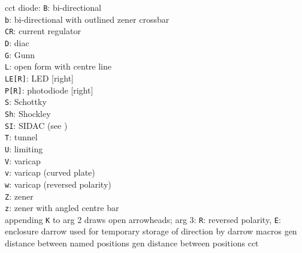 %
  {cct}%
  {diode:
   {\tt B}: bi-directional\\
   {\tt b}: bi-directional with outlined zener crossbar\\
   {\tt CR}: current regulator\\
   {\tt D}: diac\\
   {\tt G}: Gunn\\
   {\tt L}: open form with centre line\\
   {\tt LE[R]}: LED [right]\\
   {\tt P[R]}: photodiode [right]\\
   {\tt S}: Schottky\\
   {\tt Sh}: Shockley\\
   {\tt SI}: SIDAC (see )\\
   {\tt T}: tunnel\\
   {\tt U}: limiting\\
   {\tt V}: varicap\\
   {\tt v}: varicap (curved plate)\\
   {\tt w}: varicap (reversed polarity)\\
   {\tt Z}: zener\\
   {\tt z}: zener with angled centre bar\\
   appending {\tt K} to arg 2 draws open arrowheads;
   arg 3: {\tt R}: reversed polarity, {\tt E}: enclosure }%
%
  {darrow}%
  {used for temporary storage of direction by darrow macros}%
%
  {gen}%
  {distance between named positions}%
%
  {gen}%
  {distance between positions}%
%
  {cct}%

